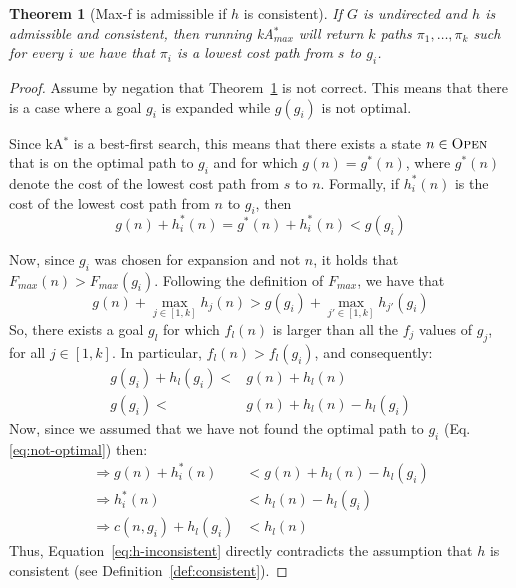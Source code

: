 \documentclass{aicom2e}
\newtheorem{theorem}{Theorem}
\newcommand{\kastar}{kA$^*$}
\newcommand{\kastarmax}{kA$^*_{max}$}
\newcommand{\maxf}{Max-f}
\newcommand{\open}{\textsc{Open}}
\begin{document}
 
\begin{theorem}[\maxf{} is admissible if $h$ is consistent]
If $G$ is undirected and $h$ is admissible and consistent, 
then running \kastarmax{} will return $k$ paths $\pi_1,\ldots, \pi_k$ such for every $i$ we have that $\pi_i$ is a lowest cost path from $s$ to $g_i$. 
\label{the:max-f}
\end{theorem}
 \begin{proof}
 Assume by negation that Theorem~\ref{the:max-f} is not correct. This means
 that there is a case where a goal $g_i$ is expanded while $g(g_i)$ is not optimal. 
 
 Since \kastar{} is a best-first search, this means that there exists a state $n\in \open{}$ that is on the optimal path to $g_i$ and for which $g(n)=g^*(n)$, where $g^*(n)$ denote the cost of the lowest cost path from $s$ to $n$. Formally, 
 if $h^*_i(n)$ is the cost of the lowest cost path from $n$ to $g_i$, then
 \begin{equation}
     g(n)+h_i^*(n) = g^*(n)+h_i^*(n) < g(g_i)
    \label{eq:not-optimal}
 \end{equation}
 
 Now, since $g_i$ was chosen for expansion and not $n$, it holds that $F_{max}(n)  > F_{max}(g_i)$. Following the definition of $F_{max}$, we have that
 \begin{equation}
     g(n)+\max_{j\in [1,k]} h_j(n) > g(g_i) + \max_{j'\in [1,k]} h_{j'}(g_i)
 \end{equation}
 So, there exists a goal $g_l$ for which $f_l(n)$ is larger than 
 all the $f_j$ values of $g_j$, for all $j\in [1,k]$. In particular, 
 $f_l(n)>f_l(g_i)$, and consequently:
 \begin{align}
     g(g_i)+h_l(g_i) < & g(n)+h_l(n) \\
     g(g_i) < & g(n)+h_l(n) - h_l(g_i) 
 \end{align} 
Now, since we assumed that we have not found the optimal path to $g_i$ (Eq.~ \ref{eq:not-optimal}) then:
\begin{align}
\Rightarrow g(n)+h^*_i(n)  & < g(n)+h_l(n) - h_l(g_i)\\
\Rightarrow h^*_i(n)  & < h_l(n) - h_l(g_i)\\
\Rightarrow c(n,g_i) + h_l(g_i) & < h_l(n) \label{eq:h-inconsistent} 
\end{align}
Thus, Equation~\ref{eq:h-inconsistent} directly contradicts the assumption
that $h$ is consistent (see Definition~\ref{def:consistent}). 
\end{proof} 
\end{document}
